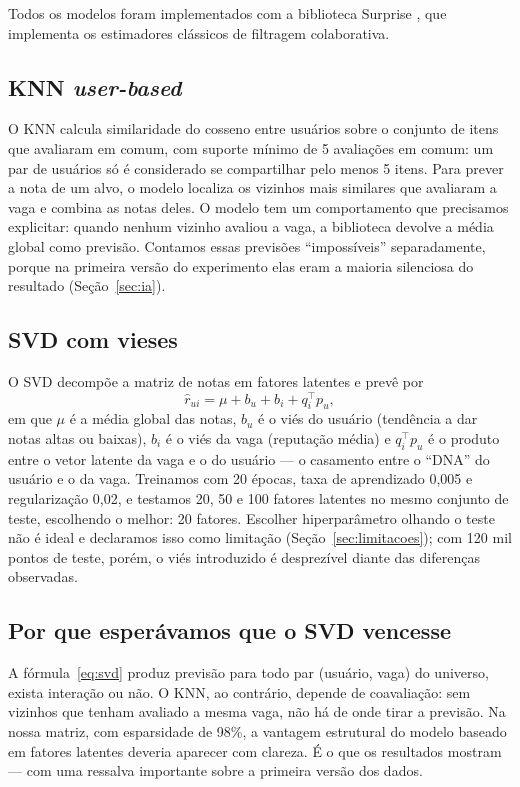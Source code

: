 \documentclass[12pt,a4paper]{article}
\begin{document}
Todos os modelos foram implementados com a biblioteca Surprise \cite{surprise}, que implementa os estimadores clássicos de filtragem colaborativa.

\subsection{KNN \textit{user-based}}

O KNN calcula similaridade do cosseno entre usuários sobre o conjunto de itens que avaliaram em comum, com suporte mínimo de 5 avaliações em comum: um par de usuários só é considerado se compartilhar pelo menos 5 itens. Para prever a nota de um alvo, o modelo localiza os vizinhos mais similares que avaliaram a vaga e combina as notas deles. O modelo tem um comportamento que precisamos explicitar: quando nenhum vizinho avaliou a vaga, a biblioteca devolve a média global como previsão. Contamos essas previsões ``impossíveis'' separadamente, porque na primeira versão do experimento elas eram a maioria silenciosa do resultado (Seção~\ref{sec:ia}).

\subsection{SVD com vieses}

O SVD decompõe a matriz de notas em fatores latentes e prevê por
\begin{equation}\label{eq:svd}
\hat{r}_{ui} = \mu + b_u + b_i + q_i^{\top} p_u,
\end{equation}
em que $\mu$ é a média global das notas, $b_u$ é o viés do usuário (tendência a dar notas altas ou baixas), $b_i$ é o viés da vaga (reputação média) e $q_i^{\top} p_u$ é o produto entre o vetor latente da vaga e o do usuário --- o casamento entre o ``DNA'' do usuário e o da vaga. Treinamos com 20 épocas, taxa de aprendizado 0,005 e regularização 0,02, e testamos 20, 50 e 100 fatores latentes no mesmo conjunto de teste, escolhendo o melhor: 20 fatores. Escolher hiperparâmetro olhando o teste não é ideal e declaramos isso como limitação (Seção~\ref{sec:limitacoes}); com 120 mil pontos de teste, porém, o viés introduzido é desprezível diante das diferenças observadas.

\subsection{Por que esperávamos que o SVD vencesse}

A fórmula~\eqref{eq:svd} produz previsão para todo par (usuário, vaga) do universo, exista interação ou não. O KNN, ao contrário, depende de coavaliação: sem vizinhos que tenham avaliado a mesma vaga, não há de onde tirar a previsão. Na nossa matriz, com esparsidade de 98\%, a vantagem estrutural do modelo baseado em fatores latentes \cite{koren} deveria aparecer com clareza. É o que os resultados mostram --- com uma ressalva importante sobre a primeira versão dos dados.
\end{document}
